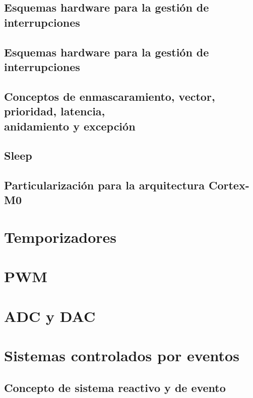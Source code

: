 \documentclass[a4paper]{book}
\begin{document}
\subsection{Esquemas hardware para la gestión de interrupciones}

\subsection{Esquemas hardware para la gestión de interrupciones}

\subsection{\texorpdfstring{Conceptos de enmascaramiento, vector, prioridad, latencia,\\ anidamiento y excepción}{Conceptos de enmascaramiento, vector, prioridad, latencia, anidamiento y excepción}}

\subsection{Sleep}

\subsection{Particularización para la arquitectura Cortex-M0}

\section{Temporizadores}

\section{PWM}

\section{ADC y DAC}

\section{Sistemas controlados por eventos}

\subsection{Concepto de sistema reactivo y de evento}
\end{document}
